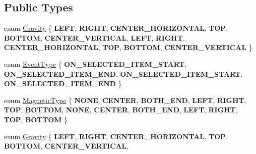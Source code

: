 \subsection*{Public Types}
\begin{DoxyCompactItemize}
\item 
enum \hyperlink{classui_1_1ListView_af79b44631b38c1782c384830acf20cf6}{Gravity} \{ \newline
{\bfseries L\+E\+FT}, 
{\bfseries R\+I\+G\+HT}, 
{\bfseries C\+E\+N\+T\+E\+R\+\_\+\+H\+O\+R\+I\+Z\+O\+N\+T\+AL}, 
{\bfseries T\+OP}, 
\newline
{\bfseries B\+O\+T\+T\+OM}, 
{\bfseries C\+E\+N\+T\+E\+R\+\_\+\+V\+E\+R\+T\+I\+C\+AL}, 
{\bfseries L\+E\+FT}, 
{\bfseries R\+I\+G\+HT}, 
\newline
{\bfseries C\+E\+N\+T\+E\+R\+\_\+\+H\+O\+R\+I\+Z\+O\+N\+T\+AL}, 
{\bfseries T\+OP}, 
{\bfseries B\+O\+T\+T\+OM}, 
{\bfseries C\+E\+N\+T\+E\+R\+\_\+\+V\+E\+R\+T\+I\+C\+AL}
 \}
\item 
enum \hyperlink{classui_1_1ListView_a7ef851492220e4bccadbaf16d95d26b9}{Event\+Type} \{ {\bfseries O\+N\+\_\+\+S\+E\+L\+E\+C\+T\+E\+D\+\_\+\+I\+T\+E\+M\+\_\+\+S\+T\+A\+RT}, 
{\bfseries O\+N\+\_\+\+S\+E\+L\+E\+C\+T\+E\+D\+\_\+\+I\+T\+E\+M\+\_\+\+E\+ND}, 
{\bfseries O\+N\+\_\+\+S\+E\+L\+E\+C\+T\+E\+D\+\_\+\+I\+T\+E\+M\+\_\+\+S\+T\+A\+RT}, 
{\bfseries O\+N\+\_\+\+S\+E\+L\+E\+C\+T\+E\+D\+\_\+\+I\+T\+E\+M\+\_\+\+E\+ND}
 \}
\item 
enum \hyperlink{classui_1_1ListView_a143593e762b785241572552b060aed6f}{Magnetic\+Type} \{ \newline
{\bfseries N\+O\+NE}, 
{\bfseries C\+E\+N\+T\+ER}, 
{\bfseries B\+O\+T\+H\+\_\+\+E\+ND}, 
{\bfseries L\+E\+FT}, 
\newline
{\bfseries R\+I\+G\+HT}, 
{\bfseries T\+OP}, 
{\bfseries B\+O\+T\+T\+OM}, 
{\bfseries N\+O\+NE}, 
\newline
{\bfseries C\+E\+N\+T\+ER}, 
{\bfseries B\+O\+T\+H\+\_\+\+E\+ND}, 
{\bfseries L\+E\+FT}, 
{\bfseries R\+I\+G\+HT}, 
\newline
{\bfseries T\+OP}, 
{\bfseries B\+O\+T\+T\+OM}
 \}
\item 
enum \hyperlink{classui_1_1ListView_af79b44631b38c1782c384830acf20cf6}{Gravity} \{ \newline
{\bfseries L\+E\+FT}, 
{\bfseries R\+I\+G\+HT}, 
{\bfseries C\+E\+N\+T\+E\+R\+\_\+\+H\+O\+R\+I\+Z\+O\+N\+T\+AL}, 
{\bfseries T\+OP}, 
\newline
{\bfseries B\+O\+T\+T\+OM}, 
{\bfseries C\+E\+N\+T\+E\+R\+\_\+\+V\+E\+R\+T\+I\+C\+AL}, 

\end{DoxyCompactItemize}

